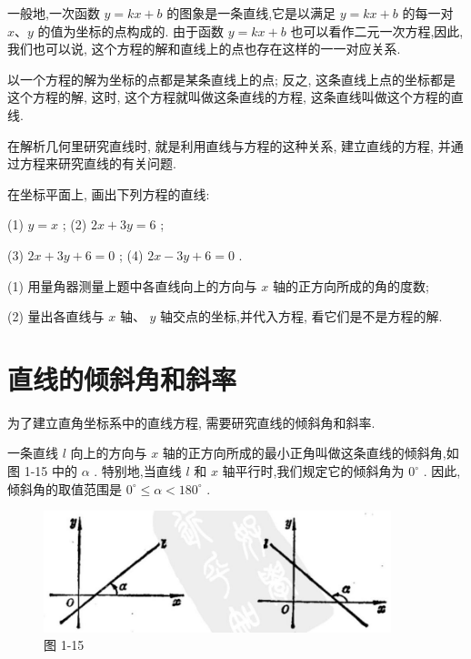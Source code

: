 \documentclass[lang=cn,newtx,10pt,scheme=chinese]{elegantbook}
\begin{document}
一般地,一次函数 \(y = {kx} + b\) 的图象是一条直线,它是以满足 \(y = {kx} + b\) 的每一对 \(x\text{、}y\) 的值为坐标的点构成的. 由于函数 \(y = {kx} + b\) 也可以看作二元一次方程,因此,我们也可以说, 这个方程的解和直线上的点也存在这样的一一对应关系.

以一个方程的解为坐标的点都是某条直线上的点; 反之, 这条直线上点的坐标都是这个方程的解, 这时, 这个方程就叫做这条直线的方程, 这条直线叫做这个方程的直线.

在解析几何里研究直线时, 就是利用直线与方程的这种关系, 建立直线的方程, 并通过方程来研究直线的有关问题.

\begin{problemset}[练习]

\item 在坐标平面上, 画出下列方程的直线:

(1) \(y = x\) ; (2) \({2x} + {3y} = 6\) ;

(3) \({2x} + {3y} + 6 = 0\) ; (4) \({2x} - {3y} + 6 = 0\) .

\item (1) 用量角器测量上题中各直线向上的方向与 \(x\) 轴的正方向所成的角的度数;

(2) 量出各直线与 \(x\) 轴、 \(y\) 轴交点的坐标,并代入方程, 看它们是不是方程的解.
\end{problemset}

\section{直线的倾斜角和斜率}

为了建立直角坐标系中的直线方程, 需要研究直线的倾斜角和斜率.

一条直线 \(l\) 向上的方向与 \(x\) 轴的正方向所成的最小正角叫做这条直线的倾斜角,如图 1-15 中的 \(\alpha\) . 特别地,当直线 \(l\) 和 \(x\) 轴平行时,我们规定它的倾斜角为 \({0}^{ \circ }\) . 因此,倾斜角的取值范围是 \({0}^{ \circ } \leq \alpha < {180}^{ \circ }\) .

\begin{figure}[h]
  \centering
  \includegraphics[max width=0.9\textwidth]{images/01912cc2-ffb6-728e-9ae7-b113ff05c64b_19_823562.jpg}
  \caption{图 1-15}
\end{figure}
\end{document}
